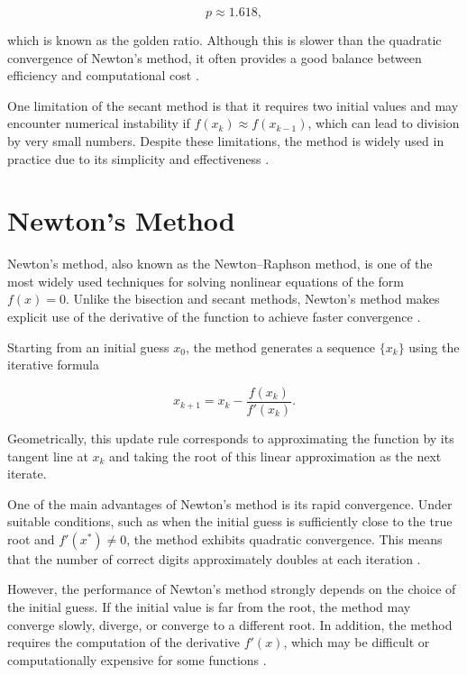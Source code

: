 \begin{equation}
p \approx 1.618,
\end{equation}

which is known as the golden ratio. Although this is slower than the quadratic convergence of Newton's method, it often provides a good balance between efficiency and computational cost \cite{burden}.

One limitation of the secant method is that it requires two initial values and may encounter numerical instability if \( f(x_k) \approx f(x_{k-1}) \), which can lead to division by very small numbers. Despite these limitations, the method is widely used in practice due to its simplicity and effectiveness \cite{cs357}.

\section{Newton's Method}

Newton's method, also known as the Newton–Raphson method, is one of the most widely used techniques for solving nonlinear equations of the form \( f(x) = 0 \). Unlike the bisection and secant methods, Newton's method makes explicit use of the derivative of the function to achieve faster convergence \cite{burden, atkinson, kelley}.

Starting from an initial guess \( x_0 \), the method generates a sequence \( \{x_k\} \) using the iterative formula

\begin{equation}
x_{k+1} = x_k - \frac{f(x_k)}{f'(x_k)}.
\end{equation}

Geometrically, this update rule corresponds to approximating the function by its tangent line at \( x_k \) and taking the root of this linear approximation as the next iterate.

One of the main advantages of Newton's method is its rapid convergence. Under suitable conditions, such as when the initial guess is sufficiently close to the true root and \( f'(x^*) \neq 0 \), the method exhibits quadratic convergence. This means that the number of correct digits approximately doubles at each iteration \cite{burden}.

However, the performance of Newton's method strongly depends on the choice of the initial guess. If the initial value is far from the root, the method may converge slowly, diverge, or converge to a different root. In addition, the method requires the computation of the derivative \( f'(x) \), which may be difficult or computationally expensive for some functions \cite{kelley}.

